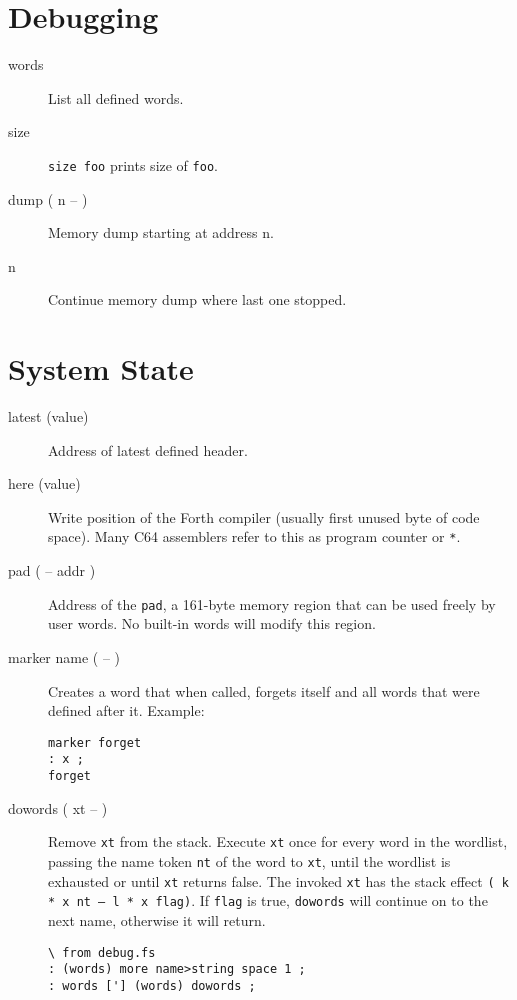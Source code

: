 \section{Debugging}

\begin{description}
\item[words] List all defined words.
\item[size] \texttt{size foo} prints size of \texttt{foo}.
\item[dump ( n -- )] Memory dump starting at address n.
\item[n] Continue memory dump where last one stopped.
\end{description}

\section{System State}

\begin{description}


\item[latest (value)] Address of latest defined header.

\item[here (value)] Write position of the Forth compiler (usually first unused byte of code space). Many C64 assemblers refer to this as program counter or \texttt{*}.

\item[pad ( -- addr )] Address of the \texttt{pad}, a 161-byte memory region that can be used freely by user words. No built-in words will modify this region.

\item[marker name ( -- )] Creates a word that when called, forgets itself and all words that were defined after it. Example:

\begin{verbatim}
marker forget
: x ;
forget
\end{verbatim}

\item[dowords ( xt -- )] Remove \texttt{xt} from the stack. Execute \texttt{xt} once for every word in the wordlist, passing the name token \texttt{nt} of the word to \texttt{xt}, until the wordlist is exhausted or until \texttt{xt} returns false. The invoked \texttt{xt} has the stack effect \texttt{( k * x nt -- l * x flag)}. If \texttt{flag} is true, \texttt{dowords} will continue on to the next name, otherwise it will return.

\begin{verbatim}
\ from debug.fs
: (words) more name>string space 1 ;
: words ['] (words) dowords ;
\end{verbatim}
\end{description}


